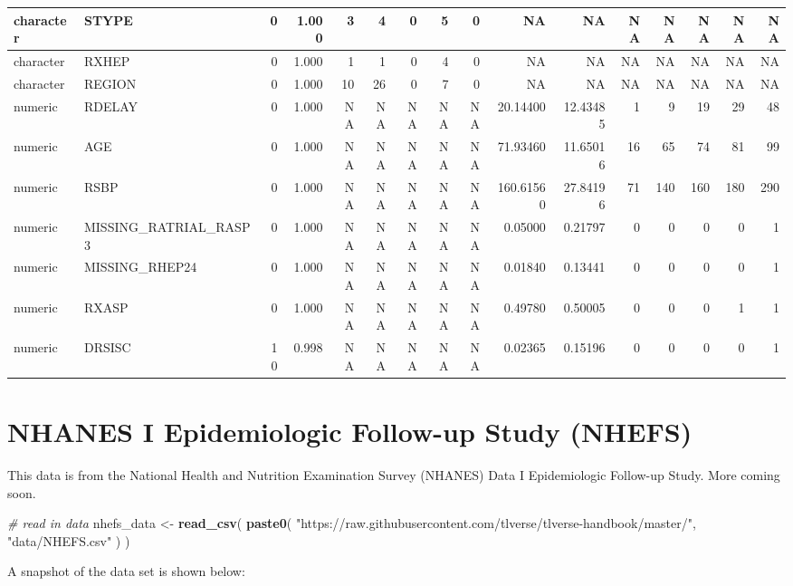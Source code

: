 \documentclass[12pt, krantz2,]{book}
\newenvironment{Shaded}{\begin{snugshade}}{\end{snugshade}}
\newcommand{\CommentTok}[1]{\textcolor[rgb]{0.56,0.35,0.01}{\textit{#1}}}
\newcommand{\KeywordTok}[1]{\textcolor[rgb]{0.13,0.29,0.53}{\textbf{#1}}}
\newcommand{\NormalTok}[1]{#1}
\newcommand{\StringTok}[1]{\textcolor[rgb]{0.31,0.60,0.02}{#1}}
\theoremstyle{definition}
\theoremstyle{definition}
\theoremstyle{definition}
\newcommand{\1}{\mathbbm{1}}
\begin{document}
\begin{tabular}{l|l|r|r|r|r|r|r|r|r|r|r|r|r|r|r}
\hline
character & STYPE & 0 & 1.000 & 3 & 4 & 0 & 5 & 0 & NA & NA & NA & NA & NA & NA & NA\\
\hline
character & RXHEP & 0 & 1.000 & 1 & 1 & 0 & 4 & 0 & NA & NA & NA & NA & NA & NA & NA\\
\hline
character & REGION & 0 & 1.000 & 10 & 26 & 0 & 7 & 0 & NA & NA & NA & NA & NA & NA & NA\\
\hline
numeric & RDELAY & 0 & 1.000 & NA & NA & NA & NA & NA & 20.14400 & 12.43485 & 1 & 9 & 19 & 29 & 48\\
\hline
numeric & AGE & 0 & 1.000 & NA & NA & NA & NA & NA & 71.93460 & 11.65016 & 16 & 65 & 74 & 81 & 99\\
\hline
numeric & RSBP & 0 & 1.000 & NA & NA & NA & NA & NA & 160.61560 & 27.84196 & 71 & 140 & 160 & 180 & 290\\
\hline
numeric & MISSING\_RATRIAL\_RASP3 & 0 & 1.000 & NA & NA & NA & NA & NA & 0.05000 & 0.21797 & 0 & 0 & 0 & 0 & 1\\
\hline
numeric & MISSING\_RHEP24 & 0 & 1.000 & NA & NA & NA & NA & NA & 0.01840 & 0.13441 & 0 & 0 & 0 & 0 & 1\\
\hline
numeric & RXASP & 0 & 1.000 & NA & NA & NA & NA & NA & 0.49780 & 0.50005 & 0 & 0 & 0 & 1 & 1\\
\hline
numeric & DRSISC & 10 & 0.998 & NA & NA & NA & NA & NA & 0.02365 & 0.15196 & 0 & 0 & 0 & 0 & 1\\
\hline
\end{tabular}

\hypertarget{NHEFS}{%
\section{NHANES I Epidemiologic Follow-up Study (NHEFS)}\label{NHEFS}}

This data is from the National Health and Nutrition Examination Survey (NHANES)
Data I Epidemiologic Follow-up Study. More coming soon.

\begin{Shaded}
\begin{Highlighting}[]
\CommentTok{# read in data}
\NormalTok{nhefs_data <-}\StringTok{ }\KeywordTok{read_csv}\NormalTok{(}
  \KeywordTok{paste0}\NormalTok{(}
    \StringTok{"https://raw.githubusercontent.com/tlverse/tlverse-handbook/master/"}\NormalTok{,}
    \StringTok{"data/NHEFS.csv"}
\NormalTok{  )}
\NormalTok{)}
\end{Highlighting}
\end{Shaded}

A snapshot of the data set is shown below:
\end{document}
